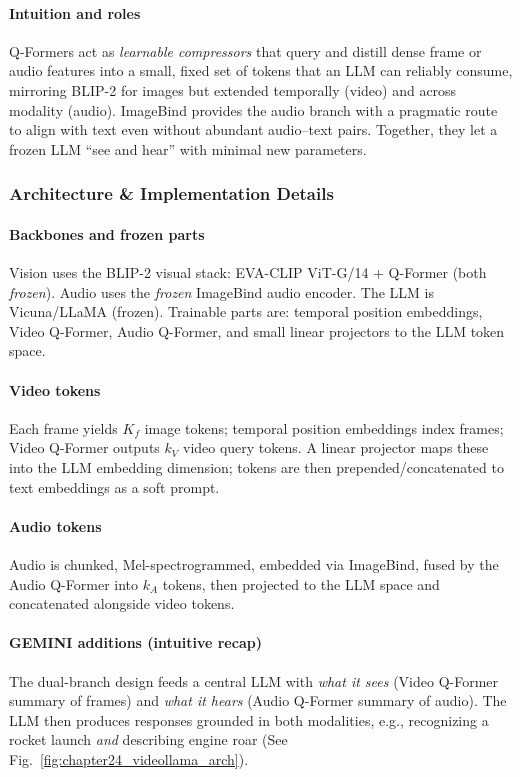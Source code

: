 \begin{enrichment}
\begin{enrichment}
        \paragraph{Intuition and roles}
        Q-Formers act as \emph{learnable compressors} that query and distill dense frame or audio features into a small, fixed set of tokens that an LLM can reliably consume, mirroring BLIP-2 for images but extended temporally (video) and across modality (audio). ImageBind provides the audio branch with a pragmatic route to align with text even without abundant audio–text pairs. Together, they let a frozen LLM “see and hear” with minimal new parameters.
        
        \subsubsection{Architecture \& Implementation Details}
        \label{subsubsec:chapter24_videollama1_arch_impl}
        
        \paragraph{Backbones and frozen parts}
        Vision uses the BLIP-2 visual stack: EVA-CLIP ViT-G/14 + Q-Former (both \emph{frozen}). Audio uses the \emph{frozen} ImageBind audio encoder. The LLM is Vicuna/LLaMA (frozen). Trainable parts are: temporal position embeddings, Video Q-Former, Audio Q-Former, and small linear projectors to the LLM token space.
        
        \paragraph{Video tokens}
        Each frame yields $K_f$ image tokens; temporal position embeddings index frames; Video Q-Former outputs $k_V$ video query tokens. A linear projector maps these into the LLM embedding dimension; tokens are then prepended/concatenated to text embeddings as a soft prompt.
        
        \paragraph{Audio tokens}
        Audio is chunked, Mel-spectrogrammed, embedded via ImageBind, fused by the Audio Q-Former into $k_A$ tokens, then projected to the LLM space and concatenated alongside video tokens.
        
        \paragraph{GEMINI additions (intuitive recap)}
        The dual-branch design feeds a central LLM with \emph{what it sees} (Video Q-Former summary of frames) and \emph{what it hears} (Audio Q-Former summary of audio). The LLM then produces responses grounded in both modalities, e.g., recognizing a rocket launch \emph{and} describing engine roar (See Fig.~\ref{fig:chapter24_videollama_arch}).
        

\end{enrichment}
\end{enrichment}
